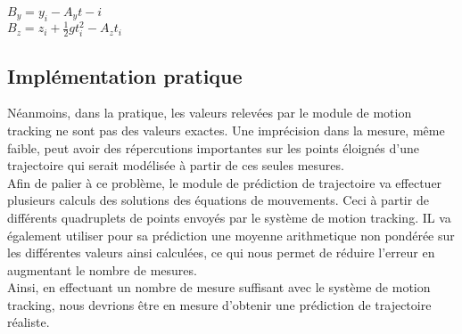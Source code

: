 $B_y = y_i - A_y t-i$\\

$B_z = z_i + \frac{1}{2} g t_i^2 - A_z t_i$\\

\subsection{Implémentation pratique}

Néanmoins, dans la pratique, les valeurs relevées par le module de motion tracking ne sont pas des valeurs exactes. Une imprécision dans la mesure, même faible, peut avoir des répercutions importantes sur les points éloignés d'une trajectoire qui serait modélisée à partir de ces seules mesures.\\

Afin de palier à ce problème, le module de prédiction de trajectoire va effectuer plusieurs calculs des solutions des équations de mouvements. Ceci à partir de différents quadruplets de points envoyés par le système de motion tracking. IL va également utiliser pour sa prédiction une moyenne arithmetique non pondérée sur les différentes valeurs ainsi calculées, ce qui nous permet de réduire l'erreur en augmentant le nombre de mesures. \\

Ainsi, en effectuant un nombre de mesure suffisant avec le système de motion tracking, nous devrions être en mesure d'obtenir une prédiction de trajectoire réaliste.
\newpage
